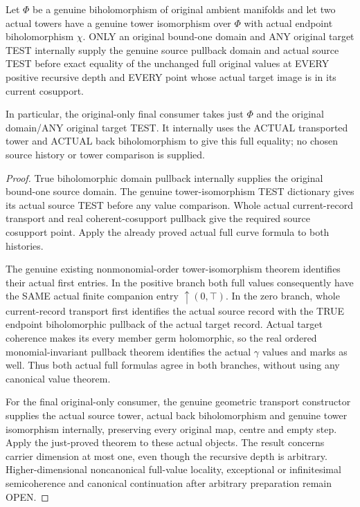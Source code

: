 \begin{theorem}
\label{hir:original-any-test-curve-full-value-tower-isomorphism}
\leanok
Let $\Phi$ be a genuine biholomorphism of original ambient manifolds and
let two actual towers have a genuine tower isomorphism over $\Phi$ with
actual endpoint biholomorphism $\chi$. ONLY an original bound-one domain
and ANY original target TEST internally supply the genuine source
pullback domain and actual source TEST before exact equality of the
unchanged full original values at EVERY positive recursive depth and
EVERY point whose actual target image is in its current cosupport.

In particular, the original-only final consumer takes just $\Phi$ and
the original domain/ANY original target TEST. It internally uses the
ACTUAL transported tower and ACTUAL back biholomorphism to give this
full equality; no chosen source history or tower comparison is supplied.
\end{theorem}
\begin{proof}
True biholomorphic domain pullback internally supplies the original
bound-one source domain. The genuine tower-isomorphism TEST dictionary
gives its actual source TEST before any value comparison. Whole actual
current-record transport and real coherent-cosupport pullback give the
required source cosupport point. Apply the already proved actual full
curve formula to both histories.

The genuine existing nonmonomial-order tower-isomorphism theorem
identifies their actual first entries. In the positive branch both full
values consequently have the SAME actual finite companion entry
$\uparrow(0,\top)$. In the zero branch, whole current-record transport
first identifies the actual source record with the TRUE endpoint
biholomorphic pullback of the actual target record. Actual target
coherence makes its every member germ holomorphic, so the real ordered
monomial-invariant pullback theorem identifies the actual $\gamma$
values and marks as well. Thus both actual full formulas agree in both
branches, without using any canonical value theorem.

For the final original-only consumer, the genuine geometric transport
constructor supplies the actual source tower, actual back biholomorphism
and genuine tower isomorphism internally, preserving every original map,
centre and empty step. Apply the just-proved theorem to these actual
objects. The result concerns carrier dimension at most one, even though
the recursive depth is arbitrary. Higher-dimensional noncanonical
full-value locality, exceptional or infinitesimal semicoherence and
canonical continuation after arbitrary preparation remain OPEN.
\end{proof}
